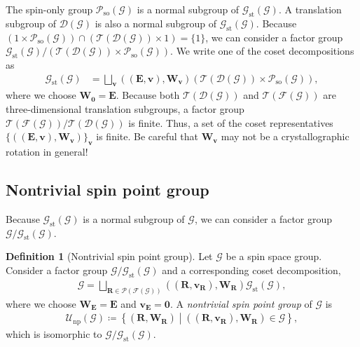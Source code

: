 \documentclass[a4paper, 11pt]{article}
\theoremstyle{definition}
\newcommand{\term}[1]{\textit{#1}}
\newcommand{\relmiddle}[1]{\mathrel{}\middle#1\mathrel{}}
\newcommand{\set}[2]{\left\{ #1 \relmiddle| #2 \right\}}
\newtheorem{definition}[theorem]{Definition}
\begin{document}
The spin-only group $\mathcal{P}_{\mathrm{so}}(\mathcal{G})$ is a normal subgroup of $\mathcal{G}_{\mathrm{st}}(\mathcal{G})$.
A translation subgroup of $\mathcal{D}(\mathcal{G})$ is also a normal subgroup of $\mathcal{G}_{\mathrm{st}}(\mathcal{G})$.
Because $(1 \times \mathcal{P}_{\mathrm{so}}(\mathcal{G})) \cap (\mathcal{T}(\mathcal{D}(\mathcal{G})) \times 1) = \{ 1 \}$, we can consider a factor group $\mathcal{G}_{\mathrm{st}}(\mathcal{G}) / ( \mathcal{T}(\mathcal{D}(\mathcal{G})) \times \mathcal{P}_{\mathrm{so}}(\mathcal{G}))$.
We write one of the coset decompositions as
\begin{align}
  \mathcal{G}_{\mathrm{st}}(\mathcal{G})
    &= \bigsqcup_{ \bm{v} }
        ((\bm{E}, \bm{v}), \bm{W}_{\bm{v}})
        \left(
          \mathcal{T}(\mathcal{D}(\mathcal{G}))
          \times
          \mathcal{P}_{\mathrm{so}}(\mathcal{G})
        \right),
\end{align}
where we choose $\bm{W}_{\bm{0}} = \bm{E}$.
Because both $\mathcal{T}(\mathcal{D}(\mathcal{G}))$ and $\mathcal{T}(\mathcal{F}(\mathcal{G}))$ are three-dimensional translation subgroups, a factor group $\mathcal{T}(\mathcal{F}(\mathcal{G})) / \mathcal{T}(\mathcal{D}(\mathcal{G}))$ is finite.
Thus, a set of the coset representatives $\{ ((\bm{E}, \bm{v}), \bm{W}_{\bm{v}}) \}_{\bm{v}}$ is finite.
Be careful that $\bm{W}_{\bm{v}}$ may not be a crystallographic rotation in general!

\subsection{Nontrivial spin point group}

Because $\mathcal{G}_{\mathrm{st}}(\mathcal{G})$ is a normal subgroup of $\mathcal{G}$, we can consider a factor group $\mathcal{G} / \mathcal{G}_{\mathrm{st}}(\mathcal{G})$.
\begin{screen}
  \begin{definition}[Nontrivial spin point group]
    Let $\mathcal{G}$ be a spin space group.
    Consider a factor group $\mathcal{G} / \mathcal{G}_{\mathrm{st}}(\mathcal{G})$ and a corresponding coset decomposition,
    \begin{align}
      \mathcal{G}
        = \bigsqcup_{ \bm{R} \in \mathcal{P}(\mathcal{F}(\mathcal{G})) } ((\bm{R}, \bm{v}_{\bm{R}}), \bm{W}_{\bm{R}}) \mathcal{G}_{\mathrm{st}}(\mathcal{G}),
    \end{align}
    where we choose $\bm{W}_{\bm{E}} = \bm{E}$ and $\bm{v}_{\bm{E}} = \bm{0}$.
    A \term{nontrivial spin point group} of $\mathcal{G}$ is
    \begin{align}
      \mathcal{U}_{\mathrm{np}}(\mathcal{G})
      \coloneqq
      \set{ (\bm{R}, \bm{W}_{\bm{R}}) }{ ((\bm{R}, \bm{v}_{\bm{R}}), \bm{W}_{\bm{R}}) \in \mathcal{G} },
    \end{align}
    which is isomorphic to $\mathcal{G} / \mathcal{G}_{\mathrm{st}}(\mathcal{G})$.
  \end{definition}
\end{screen}
\end{document}
